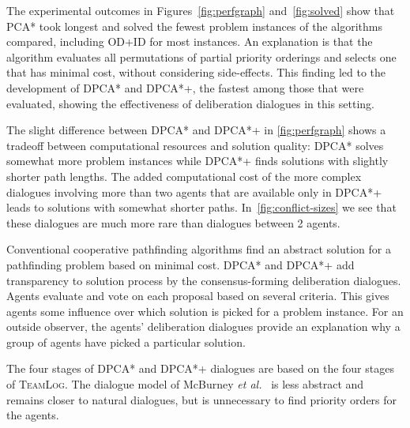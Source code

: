 
The experimental outcomes in Figures~\ref{fig:perfgraph} and~\ref{fig:solved} 
show that PCA* took longest and solved the fewest problem instances of the 
algorithms compared, including OD+ID for most instances. An explanation is that 
the algorithm 
evaluates all permutations of partial priority orderings and selects one that has
minimal cost, without considering side-effects. This finding led to the 
development of DPCA* and DPCA*+, the fastest among those that were evaluated, 
showing the effectiveness of deliberation 
dialogues in this setting.

The slight difference between DPCA* and DPCA*+ in \autoref{fig:perfgraph} shows a tradeoff between computational resources and solution quality: DPCA* solves somewhat more problem 
instances while DPCA*+ finds solutions with slightly shorter path lengths.
The added computational cost of the more complex dialogues involving more than two agents that are available only in DPCA*+ leads to solutions with somewhat shorter paths. In~\autoref{fig:conflict-sizes} we see that these dialogues are much more rare than dialogues between 2 agents. 

Conventional cooperative pathfinding algorithms find an abstract solution for a 
pathfinding problem based on minimal cost. DPCA* and DPCA*+ add transparency to 
solution process by the consensus-forming deliberation dialogues. Agents
evaluate and vote on each proposal based on several 
criteria. This gives agents some influence over which solution 
is picked for a problem instance. For an outside observer, the agents' 
deliberation dialogues provide an explanation why a group of agents have picked 
a particular 
solution. 

The four stages of DPCA* and DPCA*+ dialogues are based on the 
four stages of \textsc{TeamLog}. The dialogue model of 
McBurney \emph{et al.}~\cite{mcburney2007} is less abstract and remains closer 
to natural dialogues, but is unnecessary to find 
priority orders for the agents. 

